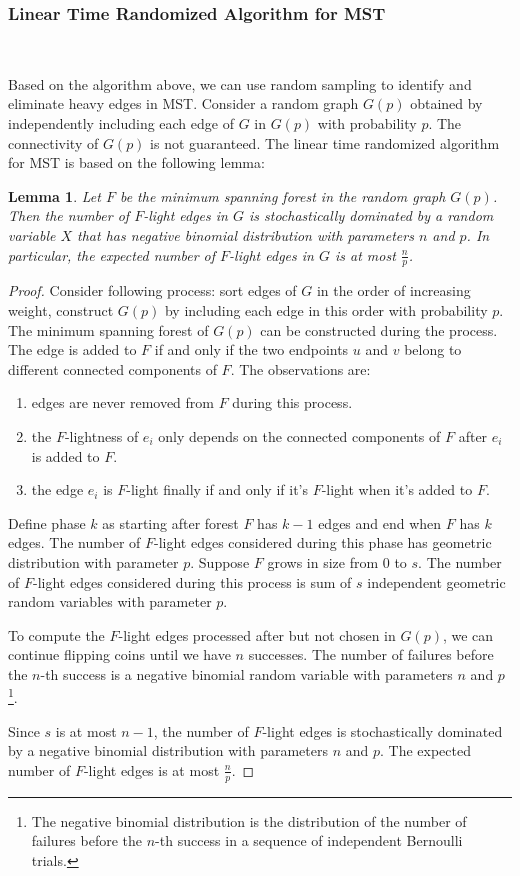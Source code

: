 \documentclass[11pt]{article}
\theoremstyle{plain}
\newtheorem{lemma}{Lemma}[section]
\begin{document}
\subsubsection{Linear Time Randomized Algorithm for MST}\

Based on the algorithm above, we can use random sampling to identify and eliminate heavy edges in MST. Consider a random graph $G(p)$ obtained by independently including each edge of $G$ in $G(p)$ with probability $p$. The connectivity of $G(p)$ is not guaranteed. The linear time randomized algorithm for MST is based on the following lemma:

\begin{lemma}
    \label{lemma:randomizedmst}
    Let $F$ be the minimum spanning forest in the random graph $G(p)$. Then the number of $F$-light edges in $G$ is stochastically dominated by a random variable $X$ that has negative binomial distribution with parameters $n$ and $p$. In particular, the expected number of $F$-light edges in $G$ is at most $\frac{n}{p}$.
\end{lemma}
\begin{proof}
    Consider following process: sort edges of $G$ in the order of increasing weight, construct $G(p)$ by including each edge in this order with probability $p$. The minimum spanning forest of $G(p)$ can be constructed during the process. The edge is added to $F$ if and only if the two endpoints $u$ and $v$ belong to different connected components of $F$. The observations are:
    \begin{enumerate}
        \item edges are never removed from $F$ during this process.
        \item the $F$-lightness of $e_i$ only depends on the connected components of $F$ after $e_i$ is added to $F$.
        \item the edge $e_i$ is $F$-light finally if and only if it's $F$-light when it's added to $F$.
    \end{enumerate}
    Define phase $k$ as starting after forest $F$ has $k-1$ edges and end when $F$ has $k$ edges. The number of $F$-light edges considered during this phase has geometric distribution with parameter $p$. Suppose $F$ grows in size from 0 to $s$. The number of $F$-light edges considered during this process is sum of $s$ independent geometric random variables with parameter $p$.

    To compute the $F$-light edges processed after but not chosen in $G(p)$, we can continue flipping coins until we have $n$ successes. The number of failures before the $n$-th success is a negative binomial random variable with parameters $n$ and $p$\footnote{The negative binomial distribution is the distribution of the number of failures before the $n$-th success in a sequence of independent Bernoulli trials.}. 

    Since $s$ is at most $n-1$, the number of $F$-light edges is stochastically dominated by a negative binomial distribution with parameters $n$ and $p$. The expected number of $F$-light edges is at most $\frac{n}{p}$.
\end{proof}
\end{document}
